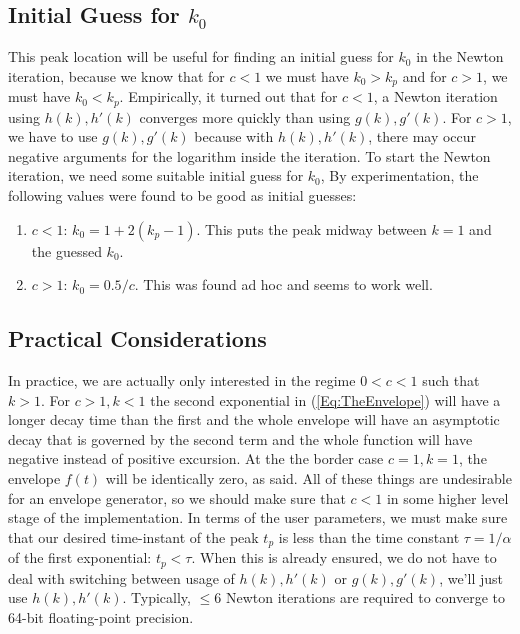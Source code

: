 \subsection{Initial Guess for $k_0$}
This peak location will be useful for finding an initial guess for $k_0$ in the Newton iteration, because we know that for $c < 1$ we must have $k_0 > k_p$ and for $c > 1$, we must have $k_0 < k_p$. Empirically, it turned out that for $c < 1$, a Newton iteration using $h(k), h'(k)$ converges more quickly than using $g(k), g'(k)$. For $c > 1$, we have to use $g(k), g'(k)$ because with $h(k), h'(k)$, there may occur negative arguments for the logarithm inside the iteration. To start the Newton iteration, we need some suitable initial guess for $k_0$, By experimentation, the following values were found to be good as initial guesses:
\begin{enumerate}
 \item $c < 1$: $k_0 = 1 + 2(k_p-1)$. This puts the peak midway between $k=1$ and the guessed $k_0$.
 \item $c > 1$: $k_0 = 0.5/c$. This was found ad hoc and seems to work well.
\end{enumerate}	

\subsection{Practical Considerations}
In practice, we are actually only interested in the regime $0 < c < 1$ such that $k > 1$. For $c > 1, k < 1$ the second exponential in (\ref{Eq:TheEnvelope}) will have a longer decay time than the first and the whole envelope will have an asymptotic decay that is governed by the second term and the whole function will have negative instead of positive excursion. At the the border case $c = 1, k = 1$, the envelope $f(t)$ will be identically zero, as said. All of these things are undesirable for an envelope generator, so we should make sure that $c < 1$ in some higher level stage of the implementation. In terms of the user parameters, we must make sure that our desired time-instant of the peak $t_p$ is less than the time constant $\tau = 1/\alpha$ of the first exponential: $t_p < \tau$. When this is already ensured, we do not have to deal with switching between usage of $h(k), h'(k)$ or $g(k), g'(k)$, we'll just use $h(k), h'(k)$. Typically, $\leq 6$ Newton iterations are required to converge to 64-bit floating-point precision.



























